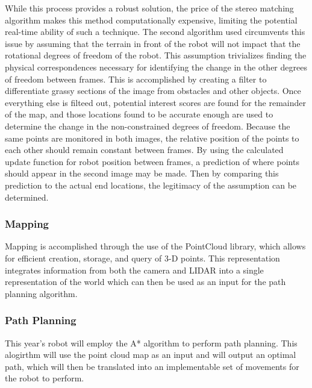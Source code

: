 While this process provides a robust solution, the price of the stereo matching algorithm makes this method computationally expensive, limiting the potential real-time ability of such a technique. The second algorithm used circumvents this issue by assuming that the terrain in front of the robot will not impact that the rotational degrees of freedom of the robot. This assumption trivializes finding the physical correspondences necessary for identifying the change in the other degrees of freedom between frames. This is accomplished by creating a filter to differentiate grassy sections of the image from obstacles and other objects. Once everything else is filteed out, potential interest scores are found for the remainder of the map, and those locations found to be accurate enough are used to determine the change in the non-constrained degrees of freedom. Because the same points are monitored in both images, the relative position of the points to each other should remain constant between frames. By using the calculated update function for robot position between frames, a prediction of where points should appear in the second image may be made. Then by comparing this prediction to the actual end locations, the legitimacy of the assumption can be determined.

\subsubsection{Mapping}
Mapping is accomplished through the use of the PointCloud library, which allows for efficient creation, storage, and query of 3-D points. This representation integrates information from both the camera and LIDAR into a single representation of the world which can then be used as an input for the path planning algorithm.
\subsubsection{Path Planning}
This year's robot will employ the A* algorithm to perform path planning. This alogirthm will use the point cloud map as an input and will output an optimal path, which will then be translated into an implementable set of movements for the robot to perform.
